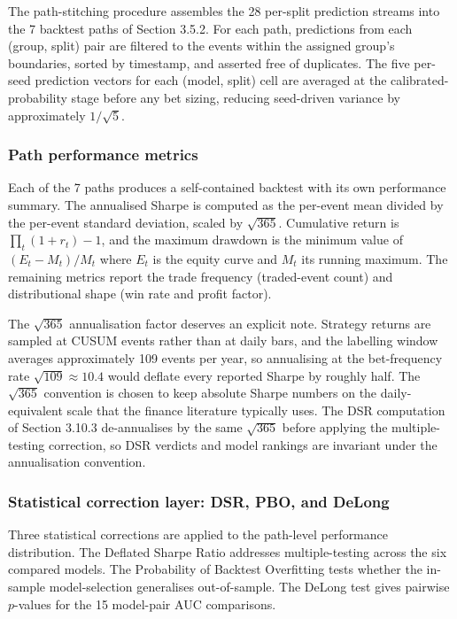 The path-stitching procedure assembles the 28 per-split prediction streams into the 7 backtest paths of Section 3.5.2. For each path, predictions from each (group, split) pair are filtered to the events within the assigned group's boundaries, sorted by timestamp, and asserted free of duplicates. The five per-seed prediction vectors for each (model, split) cell are averaged at the calibrated-probability stage before any bet sizing, reducing seed-driven variance by approximately $1/\sqrt{5}$.


\subsubsection{Path performance metrics}\label{subsubsec:path_metrics}

Each of the 7 paths produces a self-contained backtest with its own performance summary. The annualised Sharpe is computed as the per-event mean divided by the per-event standard deviation, scaled by $\sqrt{365}$. Cumulative return is $\prod_t (1 + r_t) - 1$, and the maximum drawdown is the minimum value of $(E_t - M_t) / M_t$ where $E_t$ is the equity curve and $M_t$ its running maximum. The remaining metrics report the trade frequency (traded-event count) and distributional shape (win rate and profit factor).

The $\sqrt{365}$ annualisation factor deserves an explicit note. Strategy returns are sampled at CUSUM events rather than at daily bars, and the labelling window averages approximately 109 events per year, so annualising at the bet-frequency rate $\sqrt{109} \approx 10.4$ would deflate every reported Sharpe by roughly half. The $\sqrt{365}$ convention is chosen to keep absolute Sharpe numbers on the daily-equivalent scale that the finance literature typically uses. The DSR computation of Section 3.10.3 de-annualises by the same $\sqrt{365}$ before applying the multiple-testing correction, so DSR verdicts and model rankings are invariant under the annualisation convention.


\subsubsection{Statistical correction layer: DSR, PBO, and DeLong}\label{subsubsec:correction_layer}

Three statistical corrections are applied to the path-level performance distribution. The Deflated Sharpe Ratio addresses multiple-testing across the six compared models. The Probability of Backtest Overfitting tests whether the in-sample model-selection generalises out-of-sample. The DeLong test gives pairwise $p$-values for the 15 model-pair AUC comparisons.


